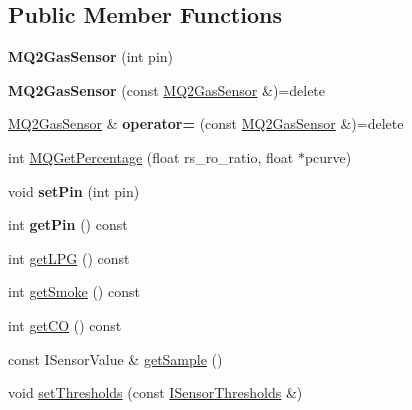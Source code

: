 \subsection*{Public Member Functions}
\begin{DoxyCompactItemize}
\item 
\mbox{\label{classathome_1_1sensor_1_1_m_q2_gas_sensor_aa311f792931e425c6d9d77bded775dfa}} 
{\bfseries M\+Q2\+Gas\+Sensor} (int pin)
\item 
\mbox{\label{classathome_1_1sensor_1_1_m_q2_gas_sensor_a93bc43d684f3d225bf5baab8048752b8}} 
{\bfseries M\+Q2\+Gas\+Sensor} (const \mbox{\hyperlink{classathome_1_1sensor_1_1_m_q2_gas_sensor}{M\+Q2\+Gas\+Sensor}} \&)=delete
\item 
\mbox{\label{classathome_1_1sensor_1_1_m_q2_gas_sensor_ab57873a8ee1bdf20619d6efa090bdd40}} 
\mbox{\hyperlink{classathome_1_1sensor_1_1_m_q2_gas_sensor}{M\+Q2\+Gas\+Sensor}} \& {\bfseries operator=} (const \mbox{\hyperlink{classathome_1_1sensor_1_1_m_q2_gas_sensor}{M\+Q2\+Gas\+Sensor}} \&)=delete
\item 
int \mbox{\hyperlink{classathome_1_1sensor_1_1_m_q2_gas_sensor_a6bf60231a95fe2ba2f5bc9c1bad714c5}{M\+Q\+Get\+Percentage}} (float rs\+\_\+ro\+\_\+ratio, float $\ast$pcurve)
\item 
\mbox{\label{classathome_1_1sensor_1_1_m_q2_gas_sensor_a872737bb858eb7e6310fb5675d0b3b72}} 
void {\bfseries set\+Pin} (int pin)
\item 
\mbox{\label{classathome_1_1sensor_1_1_m_q2_gas_sensor_a70221cb17fc88bb3784e00da53d67975}} 
int {\bfseries get\+Pin} () const
\item 
int \mbox{\hyperlink{classathome_1_1sensor_1_1_m_q2_gas_sensor_a65401612b298d829987c2b75ead8f246}{get\+L\+PG}} () const
\item 
int \mbox{\hyperlink{classathome_1_1sensor_1_1_m_q2_gas_sensor_aa6e3ad7d0382f04cf15388fd36722579}{get\+Smoke}} () const
\item 
int \mbox{\hyperlink{classathome_1_1sensor_1_1_m_q2_gas_sensor_a36cce0ec962d8b5269e39ee4c368be67}{get\+CO}} () const
\item 
const I\+Sensor\+Value \& \mbox{\hyperlink{classathome_1_1sensor_1_1_m_q2_gas_sensor_adbe1195490ce67fbed7c717abe2b5b13}{get\+Sample}} ()
\item 
void \mbox{\hyperlink{classathome_1_1sensor_1_1_m_q2_gas_sensor_a69de9f45b9babd2d111b4ce020d7c83e}{set\+Thresholds}} (const \mbox{\hyperlink{structathome_1_1sensor_1_1_i_sensor_1_1_i_sensor_thresholds}{I\+Sensor\+Thresholds}} \&)
\end{DoxyCompactItemize}
